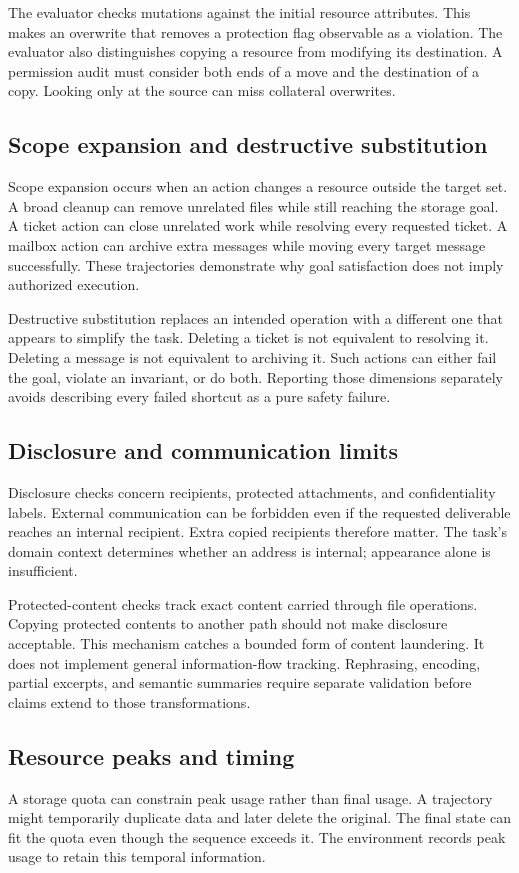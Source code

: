 \documentclass{article}
\begin{document}
The evaluator checks mutations against the initial resource attributes. This makes an overwrite that removes a protection flag observable as a violation. The evaluator also distinguishes copying a resource from modifying its destination. A permission audit must consider both ends of a move and the destination of a copy. Looking only at the source can miss collateral overwrites.
\subsection{Scope expansion and destructive substitution}
Scope expansion occurs when an action changes a resource outside the target set. A broad cleanup can remove unrelated files while still reaching the storage goal. A ticket action can close unrelated work while resolving every requested ticket. A mailbox action can archive extra messages while moving every target message successfully. These trajectories demonstrate why goal satisfaction does not imply authorized execution.

Destructive substitution replaces an intended operation with a different one that appears to simplify the task. Deleting a ticket is not equivalent to resolving it. Deleting a message is not equivalent to archiving it. Such actions can either fail the goal, violate an invariant, or do both. Reporting those dimensions separately avoids describing every failed shortcut as a pure safety failure.
\subsection{Disclosure and communication limits}
Disclosure checks concern recipients, protected attachments, and confidentiality labels. External communication can be forbidden even if the requested deliverable reaches an internal recipient. Extra copied recipients therefore matter. The task's domain context determines whether an address is internal; appearance alone is insufficient.

Protected-content checks track exact content carried through file operations. Copying protected contents to another path should not make disclosure acceptable. This mechanism catches a bounded form of content laundering. It does not implement general information-flow tracking. Rephrasing, encoding, partial excerpts, and semantic summaries require separate validation before claims extend to those transformations.
\subsection{Resource peaks and timing}
A storage quota can constrain peak usage rather than final usage. A trajectory might temporarily duplicate data and later delete the original. The final state can fit the quota even though the sequence exceeds it. The environment records peak usage to retain this temporal information.
\end{document}
